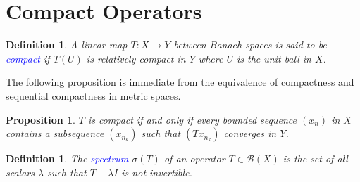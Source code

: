 \documentclass[12pt]{article}
\theoremstyle{thmstyle}
\newtheorem{proposition}[theorem]{Proposition}
\theoremstyle{defstyle}
\newtheorem{definition}[theorem]{Definition}
\newcommand{\scrB}{\mathscr B}
\newcommand{\define}[1]{\textcolor{blue}{\textit{#1}}}
\begin{document}
\section{Compact Operators}

\begin{definition}
    A linear map $T: X\to Y$ between Banach spaces is said to be \define{compact} if $T(U)$ is relatively compact in $Y$ where $U$ is the unit ball in $X$.
\end{definition}

The following proposition is immediate from the equivalence of compactness and sequential compactness in metric spaces.

\begin{proposition}
    $T$ is compact if and only if every bounded sequence $(x_n)$ in $X$ contains a subsequence $(x_{n_k})$ such that $(Tx_{n_k})$ converges in $Y$.
\end{proposition}

\begin{definition}
    The \define{spectrum} $\sigma(T)$ of an operator $T\in\scrB(X)$ is the set of all scalars $\lambda$ such that $T - \lambda I$ is not invertible.
\end{definition}
\end{document}
